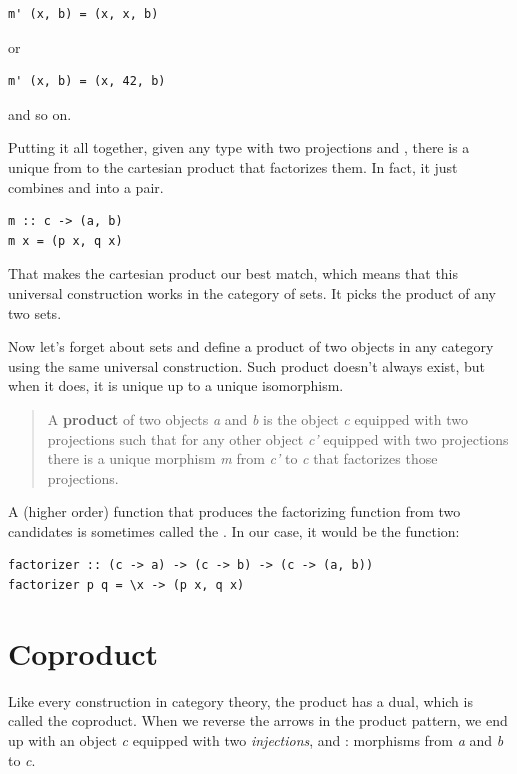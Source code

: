 \begin{verbatim}
m' (x, b) = (x, x, b)
\end{verbatim}
or

\begin{verbatim}
m' (x, b) = (x, 42, b)
\end{verbatim}
and so on.

Putting it all together, given any type  with two projections
 and , there is a unique  from 
to the cartesian product  that factorizes them. In fact,
it just combines  and  into a pair.

\begin{verbatim}
m :: c -> (a, b)
m x = (p x, q x)
\end{verbatim}
That makes the cartesian product  our best match, which
means that this universal construction works in the category of sets. It
picks the product of any two sets.

Now let's forget about sets and define a product of two objects in any
category using the same universal construction. Such product doesn't
always exist, but when it does, it is unique up to a unique isomorphism.

\begin{quote}
A \textbf{product} of two objects \emph{a} and \emph{b} is the object
\emph{c} equipped with two projections such that for any other object
\emph{c'} equipped with two projections there is a unique morphism
\emph{m} from \emph{c'} to \emph{c} that factorizes those projections.
\end{quote}

\noindent
A (higher order) function that produces the factorizing function
 from two candidates is sometimes called the
. In our case, it would be the function:

\begin{verbatim}
factorizer :: (c -> a) -> (c -> b) -> (c -> (a, b))
factorizer p q = \x -> (p x, q x)
\end{verbatim}

\section{Coproduct}\label{coproduct}

Like every construction in category theory, the product has a dual,
which is called the coproduct. When we reverse the arrows in the product
pattern, we end up with an object \emph{c} equipped with two
\emph{injections},  and : morphisms from \emph{a}
and \emph{b} to \emph{c}.

